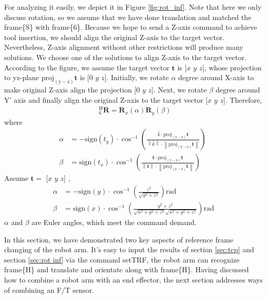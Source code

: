\par
For analyzing it easily, we depict it in Figure \ref{fig:rot_inf}. Note that here we only discuss rotation, so we assume that we have done translation and matched the frame\{S\} with frame\{6\}. Because we hope to send a Z-axis command to achieve tool insertion, we should align the original Z-axis to the target vector. Nevertheless, Z-axis alignment without other restrictions will produce many solutions. We choose one of the solutions to align Z-axis to the target vector. According to the figure, we assume the target vector $\boldsymbol{t}$ is [$x$ $y$ $z$], whose projection to yz-plane $\mathrm{proj_{(y-z)}}\boldsymbol{t}$ is [0 $y$ $z$]. Initially, we rotate $\alpha$ degree around X-axis to make original Z-axis align the projection [$0$ $y$ $z$]. Next, we rotate $\beta$ degree around Y' axis and finally align the original Z-axis to the target vector [$x$ $y$ $z$]. Therefore, 
\begin{equation}
\begin{split}
\ \  _{\mathrm{6}}^{\mathrm{H}}\mathbf{R} = \mathbf{R}_x(\alpha )\mathbf{R}_y(\beta )
\end{split}
\end{equation}
where
\begin{equation}
\begin{split}
\alpha &= 
-\mathrm{sign}(t_y)\cdot \cos^{-1} \left(  \frac{\hat{k}						\cdot 		\mathrm{proj_{(y-z)}}\boldsymbol{t}				}
								 				{\left \| \hat{k} \right \| 	\cdot \left \| \mathrm{proj_{(y-z)}}\boldsymbol{t} \right \|} \right)\ \\
\beta  &= 
\mathrm{sign}(t_x)\cdot \cos^{-1} \left( \frac{\textbf{t}							\cdot 		\mathrm{proj_{(y-z)}}\boldsymbol{t}			}
								  			  {\left \| \textbf{t}\right \| 	\cdot \left \| \mathrm{proj_{(y-z)}}\boldsymbol{t} \right \|} \right)\ 
\end{split}
\end{equation}
Assume $\boldsymbol{t} = $ [$x$ $y$ $z$] ,
\begin{equation}
\begin{split}
\alpha &= 
-\mathrm{sign}(y)\cdot \cos^{-1}	\left( \frac{z^2}{\sqrt{y^2+z^2}} \right) \mathrm{rad}\\
\beta  &= 
\mathrm{sign}(x)\cdot \cos^{-1} \left( \frac{y^2+z^2}{\sqrt{x^2+y^2+z^2}\sqrt{x^2+y^2+z^2}} \right) \mathrm{rad}
\end{split}
\end{equation}
$\alpha$ and $\beta$ are Euler angles, which meet the command demand.
\par
In this section, we have demonstrated two key aspects of reference frame changing of the robot arm. It's easy to input the results of section \ref{sec:tcp} and section \ref{sec:rot inf} via the command setTRF, the robot arm can recognize frame\{H\} and translate and orientate along with frame\{H\}. Having discussed how to combine a robot arm with an end effector, the next section addresses ways of combining an F/T sensor.